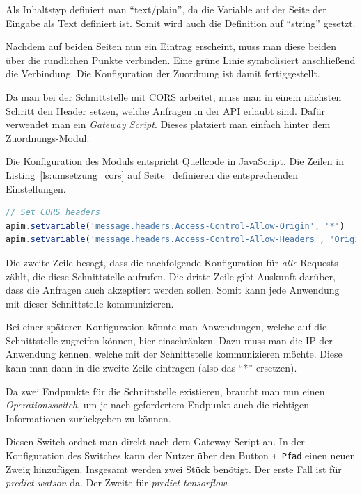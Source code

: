Als Inhaltstyp definiert man \enquote{text/plain}, da die Variable auf der Seite der Eingabe als Text definiert ist.
Somit wird auch die Definition auf \enquote{string} gesetzt.

Nachdem auf beiden Seiten nun ein Eintrag erscheint, muss man diese beiden über die rundlichen Punkte verbinden. Eine
grüne Linie symbolisiert anschließend die Verbindung. Die Konfiguration der Zuordnung ist damit fertiggestellt.

Da man bei der Schnittstelle mit CORS arbeitet, muss man in einem nächsten Schritt den Header setzen, welche Anfragen
in der API erlaubt sind. Dafür verwendet man ein \textit{Gateway Script}. Dieses platziert man einfach hinter dem
Zuordnungs-Modul.

Die Konfiguration des Moduls entspricht Quellcode in JavaScript. Die Zeilen in Listing~\ref{ls:umsetzung_cors} auf
Seite~\pageref{ls:umsetzung_cors} definieren die entsprechenden Einstellungen.

\begin{lstlisting}[language=JavaScript, caption=Gateway Script für CORS, label=ls:umsetzung_cors]
// Set CORS headers
apim.setvariable('message.headers.Access-Control-Allow-Origin', '*')
apim.setvariable('message.headers.Access-Control-Allow-Headers', 'Origin, X-Requested-With, Content-Type, Accept')
\end{lstlisting}

Die zweite Zeile besagt, dass die nachfolgende Konfiguration für \textit{alle} Requests zählt, die diese Schnittstelle
aufrufen. Die dritte Zeile gibt Auskunft darüber, dass die Anfragen auch akzeptiert werden sollen. Somit kann jede
Anwendung mit dieser Schnittstelle kommunizieren.

Bei einer späteren Konfiguration könnte man Anwendungen, welche auf die Schnittstelle zugreifen können, hier
einschränken. Dazu muss man die IP der Anwendung kennen, welche mit der Schnittstelle kommunizieren möchte. Diese kann
man dann in die zweite Zeile eintragen (also das \enquote{*} ersetzen).

Da zwei Endpunkte für die Schnittstelle existieren, braucht man nun einen \textit{Operationsswitch}, um je nach
gefordertem Endpunkt auch die richtigen Informationen zurückgeben zu können.

Diesen Switch ordnet man direkt nach dem Gateway Script an. In der Konfiguration des Switches kann der Nutzer über den
Button \texttt{+ Pfad} einen neuen Zweig hinzufügen. Insgesamt werden zwei Stück benötigt. Der erste Fall ist für
\textit{predict-watson} da. Der Zweite für \textit{predict-tensorflow}.

